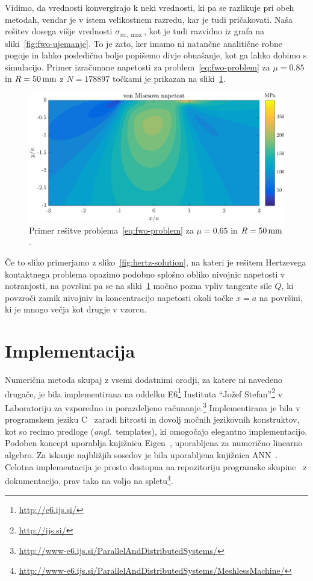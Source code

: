 \documentclass[12pt,a4paper,twoside]{article}
\theoremstyle{definition} %
\theoremstyle{plain} %
\numberwithin{equation}{section}
\newcommand{\ts}{\sigma}
\newcommand{\ang}[1]{(\textit{angl.}\ #1)}
\newlength{\iw}
\newcommand{\CC}{C\nolinebreak\hspace{-.05em}\raisebox{.4ex}{\tiny\bf +}\nolinebreak\hspace{-.10em}\raisebox{.4ex}{\tiny\bf +}}
\begin{document}
Vidimo, da vrednosti konvergirajo k neki vrednosti, ki pa se razlikuje pri obeh metodah, vendar je v
istem velikostnem razredu, kar je tudi pričakovati. Naša rešitev dosega višje vrednosti
$\ts_{xx, \max}$, kot je tudi razvidno iz grafa na sliki~\ref{fig:fwo-ujemanje}. To je zato, ker
imamo ni natančne analitične robne pogoje in lahko posledično bolje popišemo divje obnašanje,
kot ga lahko dobimo s simulacijo. Primer izračunane napetosti za problem~\eqref{eq:fwo-problem}
za $\mu=0.85$ in $R = \unit[50]{mm}$ z $N = 178897$ točkami je prikazan na sliki~\ref{fig:fwo-solution}.

\begin{figure}[h]
  \centering
  \includegraphics[width=\iw]{images/fwo_solution.png}
  \caption{Primer rešitve problema~\eqref{eq:fwo-problem} za $\mu=0.65$ in $R = \unit[50]{mm}$.}
  \label{fig:fwo-solution}
\end{figure}

Če to sliko primerjamo z sliko~\ref{fig:hertz-solution}, na kateri je rešitem Hertzevega kontaktnega
problema opazimo podobno splošno obliko nivojnic napetosti v notranjosti, na površini pa se na
sliki~\ref{fig:fwo-solution} močno pozna vpliv tangente sile $Q$, ki povzroči zamik nivojniv in
koncentracijo napetosti okoli točke $x = a$ na površini, ki je mnogo večja kot drugje v vzorcu.

\section{Implementacija}
\label{sec:implementacija}
Numerična metoda skupaj z vsemi dodatnimi orodji, za katere ni navedeno drugače, je bila
implementirana na oddelku E6\footnote{\url{http://e6.ijs.si/}} Instituta ``Jožef
Stefan''\footnote{\url{http://ijs.si/}} v Laboratoriju za vzporedno in porazdeljeno
računanje.\footnote{\url{http://www-e6.ijs.si/ParallelAndDistributedSystems/}} Implementirana je
bila v programskem jeziku \CC~\cite{stroustrup1995c++} zaradi hitrosti in dovolj močnih jezikovnih
konstruktov, kot so recimo predloge \ang{templates}, ki omogočajo elegantno implementacijo.  Podoben
koncept uporablja knjižnica Eigen~\cite{eigenweb}, uporabljena za numerično linearno algebro.  Za
iskanje najbližjih sosedov je bila uporabljena knjižnica ANN~\cite{mount1998ann}.  Celotna
implementacija je prosto dostopna na repozitoriju programske
skupine~\cite{utils_web} z dokumentacijo, prav tako na voljo na
spletu\footnote{\url{http://www-e6.ijs.si/ParallelAndDistributedSystems/MeshlessMachine/}}.
\end{document}
